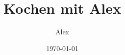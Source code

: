 \documentclass[a4paper, oneside]{book}
\title{Kochen mit Alex}
\date{\today}
\author{Alex}
\begin{document}
\maketitle
\tableofcontents

\label{LastPage}
\end{document}
